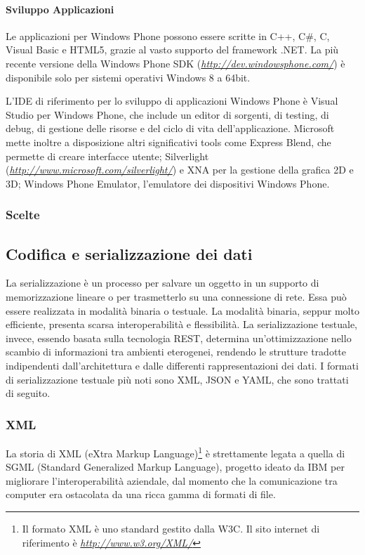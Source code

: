\paragraph{Sviluppo Applicazioni}
Le applicazioni per Windows Phone possono essere scritte in C++, C\#, C, Visual Basic e HTML5, grazie al vasto supporto del framework .NET.
La più recente versione della Windows Phone SDK (\emph{\url{http://dev.windowsphone.com/}}) è disponibile solo per sistemi operativi Windows 8 a 64bit.

L'IDE di riferimento per lo sviluppo di applicazioni Windows Phone è Visual Studio per Windows Phone, che include un editor di sorgenti, di testing, di debug, di gestione delle risorse e del ciclo di vita dell'applicazione.
Microsoft mette inoltre a disposizione altri significativi tools come Express Blend, che permette di creare interfacce utente; Silverlight (\emph{\url{http://www.microsoft.com/silverlight/}}) e XNA per la gestione della grafica 2D e 3D; Windows Phone Emulator, l'emulatore dei dispositivi Windows Phone.\\

\subsubsection{Scelte}


\subsection{Codifica e serializzazione dei dati}
La serializzazione è un processo  per salvare un oggetto in un supporto di memorizzazione lineare o per trasmetterlo su una connessione di rete.
Essa può essere realizzata in modalità binaria o testuale.
La modalità binaria, seppur molto efficiente, presenta scarsa interoperabilità e flessibilità.
La serializzazione testuale, invece, essendo basata sulla tecnologia REST, determina un'ottimizzazione nello scambio di informazioni tra ambienti eterogenei, rendendo le strutture tradotte indipendenti dall'architettura e dalle differenti rappresentazioni dei dati.
I formati di serializzazione testuale più noti sono XML, JSON e YAML, che  sono trattati di seguito.

\subsubsection{XML}
La storia di XML (eXtra Markup Language)\footnote{Il formato XML è uno standard gestito dalla W3C. Il sito internet di riferimento è \emph{\url{http://www.w3.org/XML/}}} è strettamente legata a quella di SGML (Standard Generalized Markup Language), progetto ideato da IBM per migliorare l'interoperabilità aziendale, dal momento che la comunicazione tra computer era ostacolata da una ricca gamma di formati di file.

